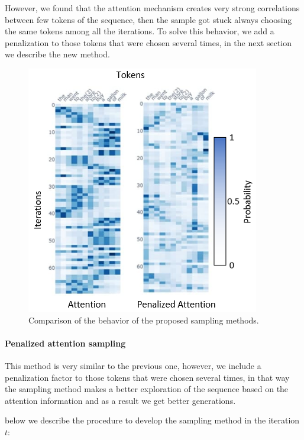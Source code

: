 \documentclass[10pt,twocolumn,letterpaper]{article}
\begin{document}
However, we found that the attention mechanism creates very strong correlations between
few tokens of the sequence, then the sample got stuck always choosing the same tokens among
all the iterations.
To solve this behavior, we add a penalization to those tokens that were
chosen several times, in the next section we describe the new method.

\begin{figure}
   \centering
   \includegraphics[scale=0.7]{attComp.PNG}
   \caption{Comparison of the behavior of the proposed sampling methods.}
   \label{fig:AttentComp}
\end{figure}

\paragraph{Penalized attention sampling}
This method is very similar to the previous one, however, we include a penalization factor
to those tokens that were chosen several times, in that way the sampling method makes a better
exploration of the sequence based on the attention information and as a result we get better
generations.

below we describe the procedure to develop the sampling method in the iteration $t$:
\end{document}
